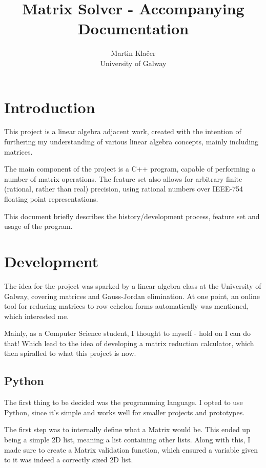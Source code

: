 \documentclass[11pt, a4paper]{article}
\title{Matrix Solver - Accompanying Documentation}
\author{Martin Klačer \\ University of Galway}
\begin{document}
\maketitle
\newpage

\tableofcontents
\newpage


\section{Introduction}

This project is a linear algebra adjacent work, created with the intention of furthering my understanding of various linear algebra concepts, mainly including matrices.

The main component of the project is a C++ program, capable of performing a number of matrix operations.
The feature set also allows for arbitrary finite (rational, rather than real) precision, using rational numbers over IEEE-754 floating point representations.

This document briefly describes the history/development process, feature set and usage of the program.


\section{Development}

The idea for the project was sparked by a linear algebra class at the University of Galway, covering matrices and Gauss-Jordan elimination.
At one point, an online tool for reducing matrices to row echelon forms automatically was mentioned, which interested me.

Mainly, as a Computer Science student, I thought to myself - hold on I can do that!
Which lead to the idea of developing a matrix reduction calculator, which then spiralled to what this project is now.


\subsection{Python}

The first thing to be decided was the programming language.
I opted to use Python, since it's simple and works well for smaller projects and prototypes.

The first step was to internally define what a Matrix would be.
This ended up being a simple 2D list, meaning a list containing other lists.
Along with this, I made sure to create a Matrix validation function, which ensured a variable given to it was indeed a correctly sized 2D list.
\end{document}
